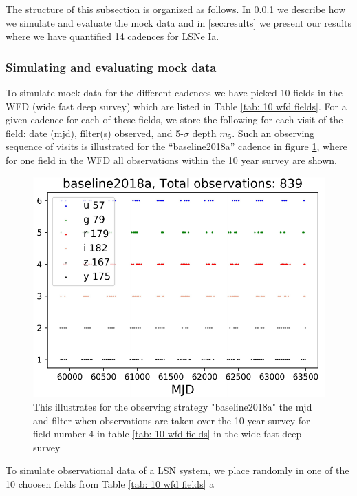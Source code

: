 The structure of this subsection is organized as follows. In
\ref{sec:simulation of mock data} we describe how we simulate and
evaluate the mock data and in \ref{sec:results} we present our results
where we have quantified 14 cadences for LSNe Ia.

\subsubsection{Simulating and evaluating mock data}
\label{sec:simulation of mock data}
To simulate mock data for the different cadences we have picked 10
fields in the WFD (wide fast deep survey) which are listed in Table
\ref{tab: 10 wfd fields}. For a given cadence for each of these
fields, we store the following for each visit of the field: date
(mjd), filter(s) observed, and 5-$\sigma$ depth $m_5$. Such an
observing sequence of visits is illustrated for the ``baseline2018a''
cadence in figure \ref{fig:observation patter LSST 10 year survey},
where for one field in the WFD all observations within the 10 year
survey are shown. 
%
\begin{figure}
\centering
\includegraphics[scale=0.7]{figures/sl_field_number3_baseline2018a_Daniel.pdf}
\caption{This illustrates for the observing strategy "baseline2018a" the mjd and filter when observations are taken over the 10 year survey for field number 4 in table \ref{tab: 10 wfd fields} in the wide fast deep survey}
\label{fig:observation patter LSST 10 year survey}
\end{figure}
%
To simulate observational data of a LSN system, we place randomly in
one of the 10 choosen fields from Table \ref{tab: 10 wfd fields} a
